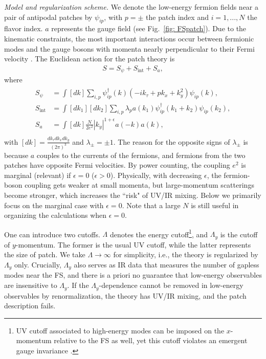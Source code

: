 \documentclass[prl,amsmath,amssymb, notitlepage, twocolumn,
nofootinbib,
superscriptaddress,
longbibliography
]{revtex4-1}
\newcommand{\beq}{\begin{eqnarray}}
\newcommand{\eeq}{\end{eqnarray}}
\newcommand{\ie}{{i.e., }}
\begin{document}
{\it Model and regularization scheme.} We denote the low-energy fermion fields near  a pair of antipodal patches by $\psi_{ip}$, 
with $p=\pm$ the patch index and $i=1,...,N$ the flavor index. 
$a$ represents the gauge field  (see Fig.~\ref{fig: FSpatch}). 
Due to the kinematic constraints, the most important interactions occur between fermionic modes and the gauge bosons 
with momenta nearly perpendicular 
to their Fermi velocity \cite{Polchinski1992, Lee2008}. 
The Euclidean action for the patch theory is \cite{ Mross2010}
\beq \label{eq: patch theory}
S = S_\psi + S_{\text{int}} + S_a,
\eeq
where 
\beq
\label{eq: Lagrangian of patch theory}
\begin{split}
S_\psi &= \int[dk] \sum_{i,p}\psi^\dagger_{ip}(k)(-i k_\tau + p k_x + k_y^2)\psi_{ip}(k),\\
S_{\text{int}} &= \int[dk_1][dk_2] \sum_{i,p}\lambda_p a(k_1) \psi^\dagger_{ip}(k_1+k_2) \psi_{ip}(k_2),\\
S_a &= \int[dk] \frac{N}{2e^2} |k_y|^{1+\epsilon} a(-k)a(k),\\
\end{split}
\eeq
with $[dk]=\frac{dk_\tau dk_x dk_y}{(2\pi)^3}$ and $\lambda_\pm=\pm 1$. The reason for the opposite signs of $\lambda_\pm$ is because $a$ couples to the currents of the fermions, and fermions from the two patches have opposite Fermi velocities. By power counting, the coupling $e^2$ is marginal (relevant) if $\epsilon=0$ ($\epsilon>0$). Physically, with decreasing $\epsilon$, 
the fermion-boson coupling gets weaker at small momenta, 
but large-momentum scatterings become stronger, 
which increases the ``risk" of UV/IR mixing.
Below we primarily focus on the marginal case with $\epsilon=0$. 
Note that 
a large $N$ is still useful in organizing the calculations 
when $\epsilon=0$.

One can introduce two cutoffs.
$\Lambda$ denotes the energy cutoff\footnote{
UV cutoff associated to high-energy modes can be imposed on the 
$x$-momentum relative to the FS as well, yet this cutoff violates an emergent gauge invariance \cite{Mross2010}.
}, and $\Lambda_y$ is the cutoff of $y$-momentum.
The former is the usual UV cutoff,
while the latter represents the size of patch.
We take $\Lambda\rightarrow\infty$ for simplicity, \ie the theory is regularized by $\Lambda_y$ only. Crucially, $\Lambda_y$ also serves as IR data that measures the number of gapless modes near the FS,
and there is a priori no guarantee that low-energy observables are insensitive to
$\Lambda_y$.
If the $\Lambda_y$-dependence cannot be removed 
in low-energy observables 
by renormalization, the theory has UV/IR mixing,
and the patch description
fails.
\end{document}
